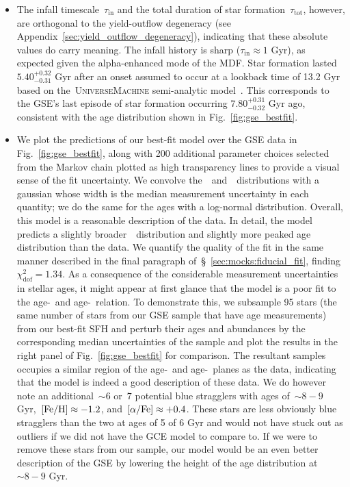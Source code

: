 \documentclass[ms.tex]{subfiles}
\begin{document}
\begin{itemize}
	\item The infall timescale~$\tau_\text{in}$ and the total duration of
	star formation~$\tau_\text{tot}$, however, are orthogonal to the
	yield-outflow degeneracy (see Appendix~\ref{sec:yield_outflow_degeneracy}),
	indicating that these absolute values do carry meaning.
	The infall history is sharp ($\tau_\text{in} \approx 1$ Gyr), as expected
	given the alpha-enhanced mode of the MDF.
	Star formation lasted~$5.40^{+0.32}_{-0.31}$ Gyr after an onset assumed to
	occur at a lookback time of 13.2 Gyr based on the~\textsc{UniverseMachine}
	semi-analytic model~\citep[][see discussion
	in~\S~\ref{sec:mocks:fiducial}]{Behroozi2019}.
	This corresponds to the GSE's last episode of star formation occurring
	$7.80^{+0.31}_{-0.32}$ Gyr ago, consistent with the age distribution shown
	in Fig.~\ref{fig:gse_bestfit}.

	\item We plot the predictions of our best-fit model over the GSE data in
	Fig.~\ref{fig:gse_bestfit}, along with 200 additional parameter choices
	selected from the Markov chain plotted as high transparency lines to
	provide a visual sense of the fit uncertainty.
	We convolve the~\feh~and~\afe~distributions with a gaussian whose width
	is the median measurement uncertainty in each quantity; we do the same for
	the ages with a log-normal distribution.
	Overall, this model is a reasonable description of the data.
	In detail, the model predicts a slightly broader~\feh~distribution and
	slightly more peaked age distribution than the data.
	We quantify the quality of the fit in the same manner described in the
	final paragraph of~\S~\ref{sec:mocks:fiducial_fit}, finding
	$\chi_\text{dof}^2 = 1.34$.
	As a consequence of the considerable measurement uncertainties in stellar
	ages, it might appear at first glance that the model is a poor fit to the
	age-\feh~and age-\afe~relation.
	To demonstrate this, we subsample 95 stars (the same number of stars from
	our GSE sample that have age measurements) from our best-fit SFH and
	perturb their ages and abundances by the corresponding median uncertainties
	of the sample and plot the results in the right panel of
	Fig.~\ref{fig:gse_bestfit} for comparison.
	The resultant samples occupies a similar region of the age-\feh~and
	age-\afe~planes as the data, indicating that the model is indeed a good
	description of these data.
	We do however note an additional~$\sim6$ or~$7$ potential blue stragglers
	with ages of~$\sim8 - 9$ Gyr,~$\text{[Fe/H]} \approx -1.2$, and~$\text{[$\alpha$/Fe]} \approx +0.4$.
	These stars are less obviously blue stragglers than the two at ages of 5
	of 6 Gyr and would not have stuck out as outliers if we did not have the
	GCE model to compare to.
	If we were to remove these stars from our sample, our model would be an
	even better description of the GSE by lowering the height of the age
	distribution at~$\sim8 - 9$ Gyr.


\end{itemize}
\end{document}
